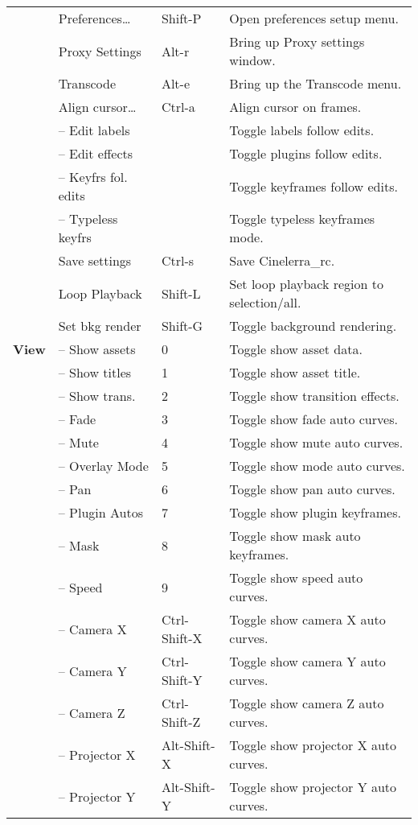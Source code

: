 \begin{longtable}[h]{>{\bfseries}p{}p{}p{}p{}}
  & Preferences\dots & Shift-P & Open preferences setup menu. \\
  & Proxy Settings & Alt-r & Bring up Proxy settings window. \\
  & Transcode & Alt-e & Bring up the Transcode menu. \\
  & Align cursor\dots & Ctrl-a & Align cursor on frames. \\
  & -- Edit labels &  & Toggle labels follow edits. \\
  & -- Edit effects &  & Toggle plugins follow edits. \\
  & -- Keyfrs fol. edits &  & Toggle keyframes follow edits. \\
  & -- Typeless keyfrs &  & Toggle typeless keyframes mode. \\
  & Save settings & Ctrl-s & Save Cinelerra\_rc. \\
  & Loop Playback & Shift-L & Set loop playback region to selection/all. \\
  & Set bkg render & Shift-G & Toggle background rendering. \\
  \midrule
  \textcolor{CinBlueText}{View} & -- Show assets & 0 & Toggle show asset data. \\
  & -- Show titles & 1 & Toggle show asset title. \\
  & -- Show trans. & 2 & Toggle show transition effects. \\
  & -- Fade & 3 & Toggle show fade auto curves. \\
  & -- Mute & 4 & Toggle show mute auto curves. \\
  & -- Overlay Mode & 5 & Toggle show mode auto curves. \\
  & -- Pan & 6 & Toggle show pan auto curves. \\
  & -- Plugin Autos & 7 & Toggle show plugin keyframes. \\
  & -- Mask & 8 & Toggle show mask auto keyframes. \\
  & -- Speed & 9 & Toggle show speed auto curves. \\
  & -- Camera X & Ctrl-Shift-X & Toggle show camera X auto curves. \\
  & -- Camera Y & Ctrl-Shift-Y & Toggle show camera Y auto curves. \\
  & -- Camera Z & Ctrl-Shift-Z & Toggle show camera Z auto curves. \\
  & -- Projector X & Alt-Shift-X & Toggle show projector X auto curves. \\
  & -- Projector Y & Alt-Shift-Y & Toggle show projector Y auto curves. \\

\end{longtable}
